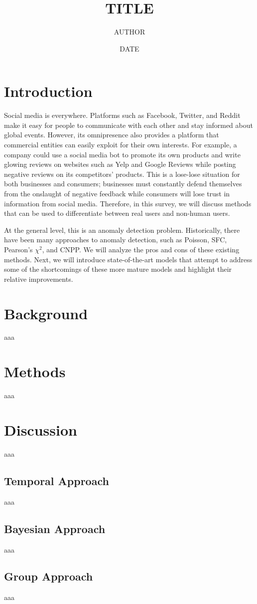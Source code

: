 \documentclass[11pt, oneside]{article}   	%
\title{TITLE}
\author{AUTHOR}
\date{DATE}							%
\begin{document}
\maketitle

\section*{Introduction}

\quad Social media is everywhere. 
Platforms such as Facebook, Twitter, and Reddit make it easy for people to communicate with each other and stay informed about global events.
However, its omnipresence also provides a platform that commercial entities can easily exploit for their own interests.
For example, a company could use a social media bot to promote its own products and write glowing reviews on websites such as Yelp and Google Reviews while posting negative reviews on its competitors' products.
This is a lose-lose situation for both businesses and consumers; businesses must constantly defend themselves from the onslaught of negative feedback while consumers will lose trust in information from social media.
Therefore, in this survey, we will discuss methods that can be used to differentiate between real users and non-human users.

\quad At the general level, this is an anomaly detection problem.
Historically, there have been many approaches to anomaly detection, such as Poisson, SFC, Pearson's $\chi^2$, and CNPP.
We will analyze the pros and cons of these existing methods.
Next, we will introduce state-of-the-art models that attempt to address some of the shortcomings of these more mature models and highlight their relative improvements.

\section*{Background}

aaa

\section*{Methods}

aaa

\section*{Discussion}

aaa

\subsection*{Temporal Approach}

aaa

\subsection*{Bayesian Approach}

aaa

\subsection*{Group Approach}

aaa
\end{document}
